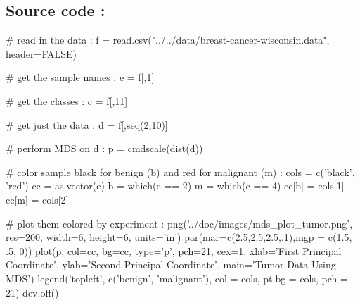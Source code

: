 \begin{multicols*}{2}
\subsection{Source code :}

\begin{Rs}
# read in the data :
f = read.csv("../../data/breast-cancer-wisconsin.data", header=FALSE)

# get the sample names :
e = f[,1]

# get the classes :
c = f[,11]

# get just the data :
d = f[,seq(2,10)]

# perform MDS on d :
p = cmdscale(dist(d))

# color sample black for benign (b) and red for malignant (m) :
cols  = c('black', 'red')
cc    = as.vector(e)
b     = which(c == 2)
m     = which(c == 4)
cc[b] = cols[1]
cc[m] = cols[2]

# plot them colored by experiment :
png('../doc/images/mds_plot_tumor.png', res=200, width=6, 
    height=6, units='in')
par(mar=c(2.5,2.5,2.5,.1),mgp = c(1.5, .5, 0))
plot(p, col=cc, bg=cc, type='p', pch=21, cex=1, 
     xlab='First Principal Coordinate',
     ylab='Second Principal Coordinate', main='Tumor Data Using MDS')
legend('topleft', c('benign', 'malignant'), col = cols, pt.bg = cols, pch = 21)
dev.off()
\end{Rs}

\end{multicols*}






